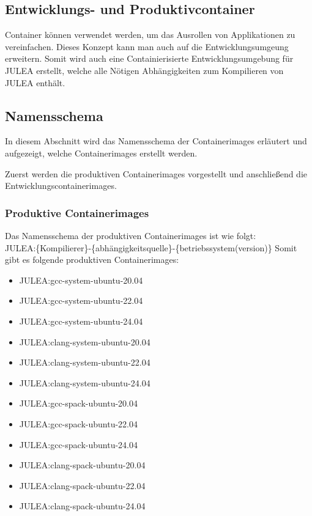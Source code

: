 \subsection{Entwicklungs- und Produktivcontainer}

Container können verwendet werden, um das Ausrollen von Applikationen zu vereinfachen. Dieses Konzept kann man auch auf die Entwicklungsumgeung erweitern. Somit wird auch eine Containierisierte Entwicklungsumgebung für JULEA erstellt, welche alle Nötigen Abhängigkeiten zum Kompilieren von JULEA enthält.

\subsection{Namensschema}

In diesem Abschnitt wird das Namensschema der Containerimages erläutert und aufgezeigt, welche Containerimages erstellt werden. 

Zuerst werden die produktiven Containerimages vorgestellt und anschließend die Entwicklungscontainerimages. 

\subsubsection{Produktive Containerimages}

Das Namensschema der produktiven Containerimages ist wie folgt: \\
JULEA:\{Kompilierer\}-\{abhängigkeitsquelle\}-\{betriebssystem(version)\}
Somit gibt es folgende produktiven Containerimages:

\begin{multicols}{2}
    \begin{itemize}
        \item JULEA:gcc-system-ubuntu-20.04  
        \item JULEA:gcc-system-ubuntu-22.04  
        \item JULEA:gcc-system-ubuntu-24.04  
        \item JULEA:clang-system-ubuntu-20.04
        \item JULEA:clang-system-ubuntu-22.04
        \item JULEA:clang-system-ubuntu-24.04
        \item JULEA:gcc-spack-ubuntu-20.04   
        \item JULEA:gcc-spack-ubuntu-22.04   
        \item JULEA:gcc-spack-ubuntu-24.04   
        \item JULEA:clang-spack-ubuntu-20.04 
        \item JULEA:clang-spack-ubuntu-22.04 
        \item JULEA:clang-spack-ubuntu-24.04 
    \end{itemize} 
\end{multicols}

